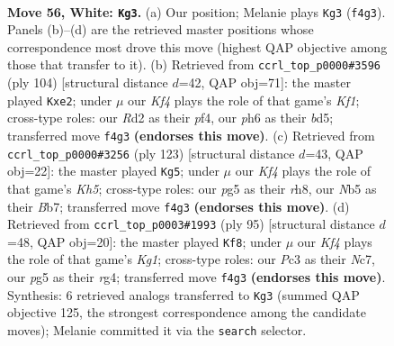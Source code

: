 \documentclass[11pt]{article}
\begin{document}
\clearpage

\begin{figure}[p]\centering
\begin{subfigure}{0.46\textwidth}\centering
\resizebox{\linewidth}{!}{%
\newchessgame
\chessboard[
  setfen={8/4p1k1/npr4p/pN4p1/P1p2K2/2P2P2/3R4/B7 w - - 0 56},
  showmover=false,
  pgfstyle=straightmove, color=movearrow, markmove={f4-g3}
]}
\caption{}
\end{subfigure}\hfill
\begin{subfigure}{0.46\textwidth}\centering
\resizebox{\linewidth}{!}{%
\newchessgame
\chessboard[
  setfen={6k1/R7/1p3r1p/3bN1p1/P2P1p2/7P/4pPP1/5K2 w - - 0 53},
  showmover=false,
  pgfstyle=straightmove, color=movearrow, markmove={f1-e2}
]}
\caption{}
\end{subfigure}
\\[4pt]
\begin{subfigure}{0.46\textwidth}\centering
\resizebox{\linewidth}{!}{%
\newchessgame
\chessboard[
  setfen={7R/1b3r2/p7/2P2n2/RP4pk/7p/PK3P1P/8 b - - 11 62},
  showmover=false,
  pgfstyle=straightmove, color=movearrow, markmove={h4-g5}
]}
\caption{}
\end{subfigure}\hfill
\begin{subfigure}{0.46\textwidth}\centering
\resizebox{\linewidth}{!}{%
\newchessgame
\chessboard[
  setfen={6k1/2n2p2/p6p/1p2P3/1P4R1/3r3P/4N1PK/8 b - - 15 48},
  showmover=false,
  pgfstyle=straightmove, color=movearrow, markmove={g8-f8}
]}
\caption{}
\end{subfigure}
\caption{\textbf{Move 56, White: \texttt{Kg3}.} (a) Our position; Melanie plays \texttt{Kg3} (\texttt{f4g3}). Panels (b)--(d) are the retrieved master positions whose correspondence most drove this move (highest QAP objective among those that transfer to it). (b) Retrieved from \texttt{ccrl\_top\_p0000\#3596} (ply 104) [structural distance $d$=42, QAP obj=71]: the master played \texttt{Kxe2}; under $\mu$ our \emph{Kf4} plays the role of that game's \emph{Kf1}; cross-type roles: our \emph{R}d2 as their \emph{p}f4, our \emph{p}h6 as their \emph{b}d5; transferred move \texttt{f4g3} \textbf{(endorses this move)}. (c) Retrieved from \texttt{ccrl\_top\_p0000\#3256} (ply 123) [structural distance $d$=43, QAP obj=22]: the master played \texttt{Kg5}; under $\mu$ our \emph{Kf4} plays the role of that game's \emph{Kh5}; cross-type roles: our \emph{p}g5 as their \emph{r}h8, our \emph{N}b5 as their \emph{B}b7; transferred move \texttt{f4g3} \textbf{(endorses this move)}. (d) Retrieved from \texttt{ccrl\_top\_p0003\#1993} (ply 95) [structural distance $d$=48, QAP obj=20]: the master played \texttt{Kf8}; under $\mu$ our \emph{Kf4} plays the role of that game's \emph{Kg1}; cross-type roles: our \emph{P}c3 as their \emph{N}c7, our \emph{p}g5 as their \emph{r}g4; transferred move \texttt{f4g3} \textbf{(endorses this move)}. Synthesis: 6 retrieved analogs transferred to \texttt{Kg3} (summed QAP objective 125, the strongest correspondence among the candidate moves); Melanie committed it via the \texttt{search} selector.}
\label{fig:thought-m110}
\end{figure}
\end{document}

